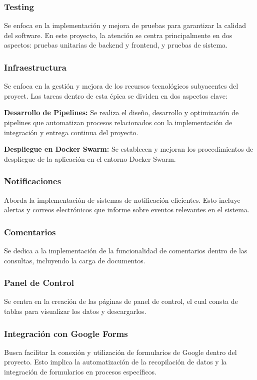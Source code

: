 \subsubsection{Testing}
Se enfoca en la implementación y mejora de pruebas para garantizar la calidad del software. En este proyecto, la atención se centra principalmente en dos aspectos: pruebas unitarias de backend y frontend, y pruebas de sistema.

\subsubsection{Infraestructura}
Se enfoca en la gestión y mejora de los recursos tecnológicos subyacentes del proyect. Las tareas dentro de esta épica se dividen en dos aspectos clave:

\textbf{Desarrollo de Pipelines:} Se realiza el diseño, desarrollo y optimización de pipelines que automatizan procesos relacionados con la implementación de integración y entrega continua del proyecto.

\textbf{Despliegue en Docker Swarm:} Se establecen y mejoran los procedimientos de despliegue de la aplicación en el entorno Docker Swarm. 



\subsubsection{Notificaciones}
Aborda la implementación de sistemas de notificación eficientes. Esto incluye alertas y correos electrónicos que informe sobre eventos relevantes en el sistema.

\subsubsection{Comentarios}
Se dedica a la implementación de la funcionalidad de comentarios dentro de las consultas, incluyendo la carga de documentos.

\subsubsection{Panel de Control}
Se centra en la creación de las páginas de panel de control, el cual consta de tablas para visualizar los datos y descargarlos.

\subsubsection{Integración con Google Forms}
Busca facilitar la conexión y utilización de formularios de Google dentro del proyecto. Esto implica la automatización de la recopilación de datos y la integración de formularios en procesos específicos.

